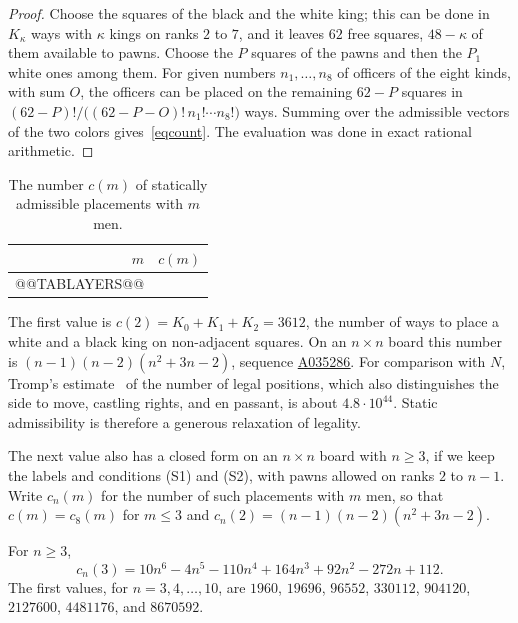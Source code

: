 \documentclass[12pt,reqno]{article}
\newcommand{\seqnum}[1]{\href{https://oeis.org/#1}{\rm \underline{#1}}}
\begin{document}
\begin{proof}
Choose the squares of the black and the white king; this can be done in $K_\kappa$ ways with
$\kappa$ kings on ranks $2$ to $7$, and it leaves $62$ free squares, $48-\kappa$ of them
available to pawns. Choose the $P$ squares of the pawns and then the $P_1$ white ones among
them. For given numbers $n_1,\ldots,n_8$ of officers of the eight kinds, with sum $O$, the
officers can be placed on the remaining $62-P$ squares in
$(62-P)!/\bigl((62-P-O)!\,n_1!\cdots n_8!\bigr)$ ways. Summing over the admissible vectors
of the two colors gives~\eqref{eqcount}. The evaluation was done in exact rational arithmetic.
\end{proof}

\begin{table}[H]
\begin{center}
\begin{tabular}{r|r}
$m$ & $c(m)$\\ \hline
@@TABLAYERS@@
\end{tabular}
\end{center}
\caption{The number $c(m)$ of statically admissible placements with $m$ men.}
\label{tablayers}
\end{table}

The first value is $c(2)=K_0+K_1+K_2=3612$, the number of ways to place a white and a black
king on non-adjacent squares. On an $n\times n$ board this number is
$(n-1)(n-2)(n^2+3n-2)$, sequence \seqnum{A035286}. For comparison with $N$, Tromp's
estimate~\cite{tromp} of the number of legal positions, which also distinguishes the side to
move, castling rights, and en passant, is about $4.8\cdot 10^{44}$. Static admissibility is therefore
a generous relaxation of legality.

The next value also has a closed form on an $n\times n$ board with $n\geq 3$, if we keep the
labels and conditions (S1) and (S2), with pawns allowed on ranks $2$ to $n-1$. Write
$c_n(m)$ for the number of such placements with $m$ men, so that $c(m)=c_8(m)$ for $m\leq 3$
and $c_n(2)=(n-1)(n-2)(n^2+3n-2)$.

\begin{proposition}\label{propnn}
For $n\geq 3$,
\begin{displaymath}
c_n(3)=10n^6-4n^5-110n^4+164n^3+92n^2-272n+112 .
\end{displaymath}
The first values, for $n=3,4,\ldots,10$, are $1960$, $19696$, $96552$, $330112$, $904120$,
$2127600$, $4481176$, and $8670592$.
\end{proposition}
\end{document}
